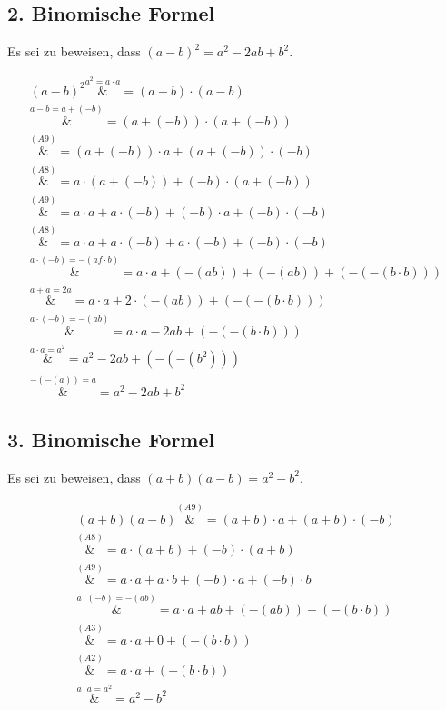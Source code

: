 \documentclass{article}
\begin{document}
\subsection{2. Binomische Formel}

Es sei zu beweisen, dass $(a - b)^2 = a^2 - 2ab + b^2$.

\begin{align*}
  (a - b)^2 \overset{a^2 = a \cdot a}&= (a - b) \cdot (a - b) \\
            \overset{a - b = a + (-b)}&= (a + (-b)) \cdot (a + (-b)) \\
            \overset{\hyperref[a9]{(A9)}}&= (a + (-b)) \cdot a + (a + (-b)) \cdot (-b) \\
            \overset{\hyperref[a8]{(A8)}}&= a \cdot (a + (-b)) + (-b) \cdot (a + (-b)) \\
            \overset{\hyperref[a9]{(A9)}}&= a \cdot a + a \cdot (-b) + (-b) \cdot a + (-b) \cdot (-b) \\
            \overset{\hyperref[a8]{(A8)}}&= a \cdot a + a \cdot (-b) + a \cdot (-b) + (-b) \cdot (-b) \\
            \overset{\hyperref[prod_add_inv]{a \cdot (-b) = -(af \cdot b)}}&= a \cdot a + (-(ab)) + (-(ab)) + (-(-(b \cdot b))) \\
            \overset{a + a = 2a}&= a \cdot a + 2 \cdot (-(ab)) + (-(-(b \cdot b))) \\
            \overset{\hyperref[prod_add_inv]{a \cdot (-b) = -(ab)}}&= a \cdot a - 2ab + (-(-(b \cdot b))) \\
            \overset{a \cdot a = a^2}&= a^2 - 2ab + (-(-(b^2))) \\
            \overset{\hyperref[add_add_inv]{-(-(a)) = a}}&= a^2 - 2ab + b^2
\end{align*}

\subsection{3. Binomische Formel}

Es sei zu beweisen, dass $(a + b)(a - b) = a^2 - b^2$.

\begin{align*}
  (a + b)(a - b) \overset{\hyperref[a9]{(A9)}}&= (a + b) \cdot a + (a + b) \cdot (-b) \\
                 \overset{\hyperref[a8]{(A8)}}&= a \cdot (a + b) + (-b) \cdot (a + b) \\
                 \overset{\hyperref[a9]{(A9)}}&= a \cdot a + a \cdot b + (-b) \cdot a + (-b) \cdot b \\
                 \overset{\hyperref[prod_add_inv]{a \cdot (-b) = -(ab)}}&= a \cdot a + ab + (-(ab)) + (-(b \cdot b)) \\
                 \overset{\hyperref[a3]{(A3)}}&= a \cdot a + 0 + (-(b \cdot b)) \\
                 \overset{\hyperref[a2]{(A2)}}&= a \cdot a + (-(b \cdot b)) \\
                 \overset{a \cdot a = a^2}&= a^2 - b^2
\end{align*}
\end{document}
